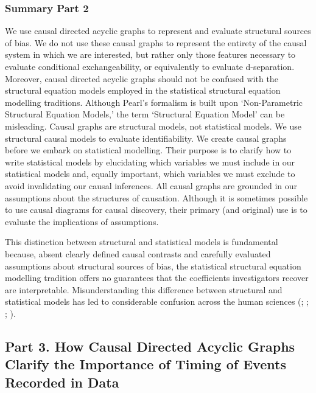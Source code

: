 \documentclass[
  single column]{article}
\begin{document}
\newpage{}

\subsubsection{Summary Part 2}\label{summary-part-2}

We use causal directed acyclic graphs to represent and evaluate
structural sources of bias. We do not use these causal graphs to
represent the entirety of the causal system in which we are interested,
but rather only those features necessary to evaluate conditional
exchangeability, or equivalently to evaluate d-separation. Moreover,
causal directed acyclic graphs should not be confused with the
structural equation models employed in the statistical structural
equation modelling traditions. Although Pearl's formalism is built upon
`Non-Parametric Structural Equation Models,' the term `Structural
Equation Model' can be misleading. Causal graphs are structural models,
not statistical models. We use structural causal models to evaluate
identifiability. We create causal graphs before we embark on statistical
modelling. Their purpose is to clarify how to write statistical models
by elucidating which variables we must include in our statistical models
and, equally important, which variables we must exclude to avoid
invalidating our causal inferences. All causal graphs are grounded in
our assumptions about the structures of causation. Although it is
sometimes possible to use causal diagrams for causal discovery, their
primary (and original) use is to evaluate the implications of
assumptions.

This distinction between structural and statistical models is
fundamental because, absent clearly defined causal contrasts and
carefully evaluated assumptions about structural sources of bias, the
statistical structural equation modelling tradition offers no guarantees
that the coefficients investigators recover are interpretable.
Misunderstanding this difference between structural and statistical
models has led to considerable confusion across the human sciences
(;
;
;
).

\subsection{Part 3. How Causal Directed Acyclic Graphs Clarify the
Importance of Timing of Events Recorded in Data}\label{id-sec-3}
\end{document}
